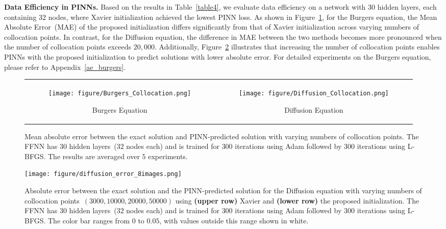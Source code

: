 \documentclass{article} \usepackage{iclr2025_conference,times}
\begin{document}
\textbf{Data Efficiency in PINNs.} Based on the results in Table~\ref{table4}, we evaluate data efficiency on a network with $30$ hidden layers, each containing $32$ nodes, where Xavier initialization achieved the lowest PINN loss. As shown in Figure~\ref{fig:burgers_diffusion}, for the Burgers equation, the Mean Absolute Error~(MAE) of the proposed initialization differs significantly from that of Xavier initialization across varying numbers of collocation points. In contrast, for the Diffusion equation, the difference in MAE between the two methods becomes more pronounced when the number of collocation points exceeds $20,000$. Additionally, Figure~\ref{fig:diffusion_8images} illustrates that increasing the number of collocation points enables PINNs with the proposed initialization to predict solutions with lower absolute error. For detailed experiments on the Burgers equation, please refer to Appendix~\ref{ae_burgers}.











\begin{figure}[t!]
\centering 
\begin{tabular}{cc}
\begin{subfigure}[b]{0.46\textwidth}
    \centering
    \texttt{[image: figure/Burgers\_Collocation.png]}
    \caption{Burgers Equation}
\end{subfigure} &
\begin{subfigure}[b]{0.46\textwidth}
    \centering
    \texttt{[image: figure/Diffusion\_Collocation.png]}
    \caption{Diffusion Equation}
\end{subfigure} 
\end{tabular}
\caption{Mean absolute error between the exact solution and PINN-predicted solution with varying numbers of collocation points. The FFNN has $30$ hidden layers~($32$ nodes each) and is trained for $300$ iterations using Adam followed by $300$ iterations using L-BFGS. The results are averaged over $5$ experiments.} 
\label{fig:burgers_diffusion}
\end{figure}





\begin{figure}[h!]
\centering 
\texttt{[image: figure/diffusion\_error\_8images.png]}
\caption{
Absolute error between the exact solution and the PINN-predicted solution for the Diffusion equation with varying numbers of collocation points~$(3000, 10000, 20000, 50000)$ using \textbf{(upper row)} Xavier and \textbf{(lower row)} the proposed initialization. The FFNN has 30 hidden layers~($32$ nodes each) and is trained for $300$ iterations using Adam followed by $300$ iterations using L-BFGS. The color bar ranges from $0$ to $0.05$, with values outside this range shown in white.}
\label{fig:diffusion_8images}
\end{figure}
\end{document}
